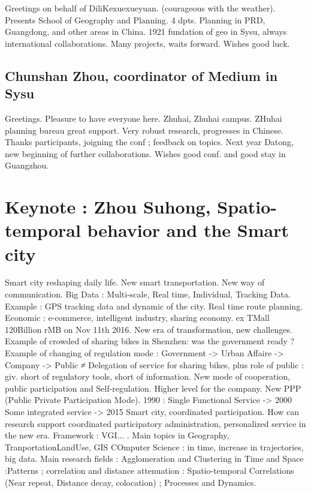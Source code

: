 Greetings on behalf of DiliKexuexueyuan. (courageous with the weather). Presents School of Geography and Planning. 4 dpts. Planning in PRD, Guangdong, and other areas in China. 1921 fundation of geo in Sysu, always international collaborations. Many projects, waits forward. Wishes good luck.


\subsection{Chunshan Zhou, coordinator of Medium in Sysu}

Greetings. Pleasure to have everyone here. Zhuhai, Zhuhai campus. ZHuhai planning bureau great support. Very robust research, progresses in Chinese. Thanks participants, joigning the conf ; feedback on topics. Next year Datong, new beginning of further collaborations. Wishes good conf. and good stay in Guangzhou.



\section*{Keynote : Zhou Suhong, Spatio-temporal behavior and the Smart city}

Smart city reshaping daily life. New smart transportation. New way of communication. Big Data : Multi-scale, Real time, Individual, Tracking Data. Example : GPS tracking data and dynamic of the city. Real time route planning. Economic : e-commerce, intelligent industry, sharing economy. ex TMall 120Billion rMB on Nov 11th 2016. New era of transformation, new challenges. Example of crowded of sharing bikes in Shenzhen: was the government ready ? Example of changing of regulation mode : Government -> Urban Affaire -> Company -> Public ≠ Delegation of service for sharing bikes, plus role of public : giv. short of regulatory tools, short of information. New mode of cooperation, public participation and Self-regulation. Higher level for the company. New PPP (Public Private Participation Mode). 1990 : Single Functional Service -> 2000 Some integrated service -> 2015 Smart city, coordinated participation. How can research support coordinated participatory administration, personalized service in the new era. Framework : VGI... . Main topics in Geography, TranportationLandUse, GIS COmputer Science : in time, increase in trajectories, big data. Main research fields : Agglomeration and Clustering in Time and Space :Patterns ; correlation and distance attenuation : Spatio-temporal Correlations (Near repeat, Distance decay, colocation) ; Processes and Dynamics.

